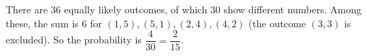 There are $36$ equally likely outcomes, of which $30$ show different numbers. Among these, the sum is $6$ for $(1,5),(5,1),(2,4),(4,2)$ (the outcome $(3,3)$ is excluded). So the probability is $\dfrac{4}{30}=\boxed{\dfrac{2}{15}}$.
